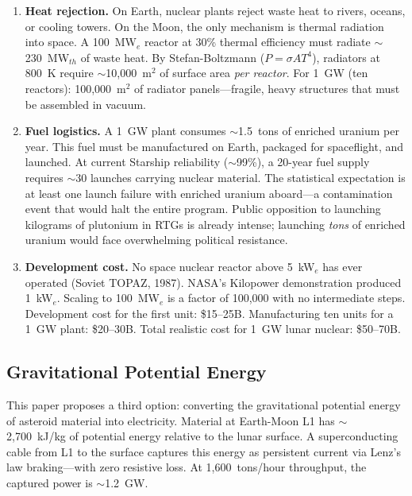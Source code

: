 \documentclass[12pt,letterpaper]{article}
\begin{document}
\begin{enumerate}[label=(\roman*)]
\item \textbf{Heat rejection.} On Earth, nuclear plants reject waste heat to rivers, oceans, or cooling towers. On the Moon, the only mechanism is thermal radiation into space. A 100~MW$_e$ reactor at 30\% thermal efficiency must radiate $\sim$230~MW$_{th}$ of waste heat. By Stefan-Boltzmann ($P = \sigma A T^4$), radiators at 800~K require $\sim$10,000~m$^2$ of surface area \emph{per reactor}. For 1~GW (ten reactors): 100,000~m$^2$ of radiator panels---fragile, heavy structures that must be assembled in vacuum.

\item \textbf{Fuel logistics.} A 1~GW plant consumes $\sim$1.5~tons of enriched uranium per year. This fuel must be manufactured on Earth, packaged for spaceflight, and launched. At current Starship reliability ($\sim$99\%), a 20-year fuel supply requires $\sim$30 launches carrying nuclear material. The statistical expectation is at least one launch failure with enriched uranium aboard---a contamination event that would halt the entire program. Public opposition to launching kilograms of plutonium in RTGs is already intense; launching \emph{tons} of enriched uranium would face overwhelming political resistance.

\item \textbf{Development cost.} No space nuclear reactor above 5~kW$_e$ has ever operated (Soviet TOPAZ, 1987). NASA's Kilopower demonstration produced 1~kW$_e$. Scaling to 100~MW$_e$ is a factor of 100,000 with no intermediate steps. Development cost for the first unit: \$15--25B. Manufacturing ten units for a 1~GW plant: \$20--30B. Total realistic cost for 1~GW lunar nuclear: \$50--70B.
\end{enumerate}

\subsection{Gravitational Potential Energy}

This paper proposes a third option: converting the gravitational potential energy of asteroid material into electricity. Material at Earth-Moon L1 has $\sim$2,700~kJ/kg of potential energy relative to the lunar surface. A superconducting cable from L1 to the surface captures this energy as persistent current via Lenz's law braking---with zero resistive loss. At 1,600~tons/hour throughput, the captured power is $\sim$1.2~GW.
\end{document}
